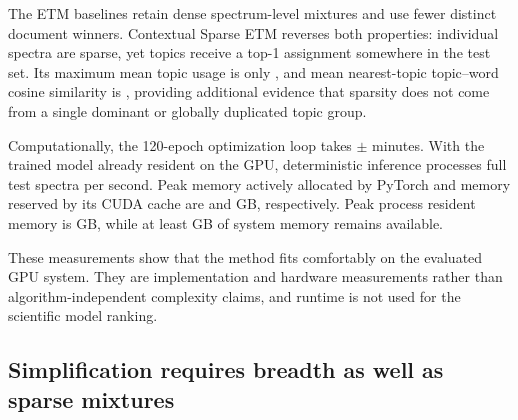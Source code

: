 \documentclass[10pt,a4paper]{article}
\begin{document}
\begin{table}[H]
\centering
\footnotesize
\caption{Held-out test sparsity and inventory diagnostics. Eff. is the
entropy-effective topic count; support counts exactly non-zero mixture weights;
unique top-1 counts distinct document winners; and active topics have mean
weight above 0.0005. Corpus eff. applies the entropy-effective count to mean
corpus weights, and nearest beta is mean nearest-neighbor cosine similarity
between topic--word probability vectors.}
\label{tab:diagnostics}
\end{table}

The ETM baselines retain dense spectrum-level mixtures and use fewer distinct
document winners. Contextual Sparse ETM reverses both properties: individual
spectra are sparse, yet \UniqueTopOneTopics{} topics receive a top-1 assignment
somewhere in the test set. Its maximum mean topic usage is only
\MaximumMeanTopicUsage{}, and mean nearest-topic topic--word cosine similarity
is \MeanNearestBetaCosine{}, providing additional evidence that sparsity does
not come from a single dominant or globally duplicated topic group.

Computationally, the 120-epoch optimization loop takes
\TrainingMinutesMean{} $\pm$ \TrainingMinutesSD{} minutes. With the trained model
already resident on the GPU, deterministic inference processes
\TestThroughput{} full test spectra per second. Peak memory actively
allocated by PyTorch and memory reserved by its CUDA cache are
\PeakCudaAllocatedGB{} and \PeakCudaReservedGB{} GB, respectively. Peak process
resident memory is \PeakProcessGB{} GB, while at least
\MinimumSystemAvailableGB{} GB of system memory remains available.

These measurements show that the method fits comfortably on the evaluated GPU
system. They are implementation and hardware measurements rather than
algorithm-independent complexity claims, and runtime is not used for the
scientific model ranking.

\subsection{Simplification requires breadth as well as sparse mixtures}
\label{sec:simplification-results}
\end{document}
